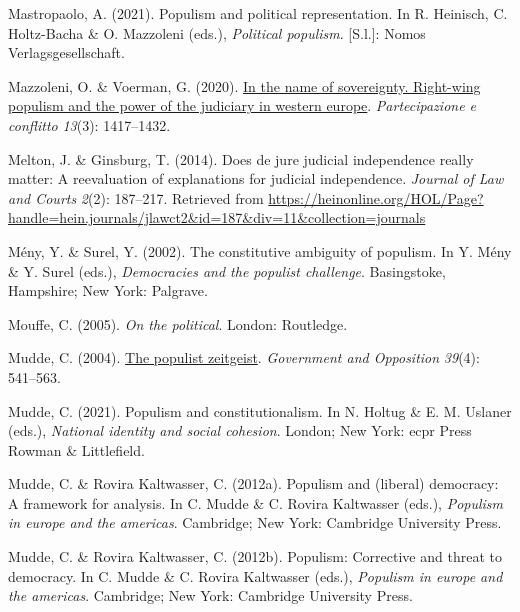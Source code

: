\documentclass[
  abstract]{article}
\newlength{\cslhangindent}
\newlength{\cslentryspacingunit} %
\newenvironment{CSLReferences}[2] %
 {%
  \setlength{\parindent}{0pt}
  \ifodd #1
  \let\oldpar\par
  \def\par{\hangindent=\cslhangindent\oldpar}
  \fi
  \setlength{\parskip}{#2\cslentryspacingunit}
 }%
 {}
\begin{document}
\begin{CSLReferences}{1}{0}
\leavevmode{}%
Mastropaolo, A. (2021). Populism and political representation. In R.
Heinisch, C. Holtz-Bacha \& O. Mazzoleni (eds.), \emph{Political
populism}. {[}S.l.{]}: {Nomos Verlagsgesellschaft}.

\leavevmode{}%
Mazzoleni, O. \& Voerman, G. (2020).
\href{https://doi.org/10.1285/I20356609V13I3P1417}{In the name of
sovereignty. Right-wing populism and the power of the judiciary in
western europe}. \emph{Partecipazione e conflitto} \emph{13}(3):
1417--1432.

\leavevmode{}%
Melton, J. \& Ginsburg, T. (2014). Does de jure judicial independence
really matter: A reevaluation of explanations for judicial independence.
\emph{Journal of Law and Courts} \emph{2}(2): 187--217. Retrieved from
\url{https://heinonline.org/HOL/Page?handle=hein.journals/jlawct2\&id=187\&div=11\&collection=journals}

\leavevmode{}%
Mény, Y. \& Surel, Y. (2002). The constitutive ambiguity of populism. In
Y. Mény \& Y. Surel (eds.), \emph{Democracies and the populist
challenge}. Basingstoke, Hampshire; New York: Palgrave.

\leavevmode{}%
Mouffe, C. (2005). \emph{On the political}. London: Routledge.

\leavevmode{}%
Mudde, C. (2004).
\href{https://doi.org/10.1111/j.1477-7053.2004.00135.x}{The populist
zeitgeist}. \emph{Government and Opposition} \emph{39}(4): 541--563.

\leavevmode{}%
Mudde, C. (2021). Populism and constitutionalism. In N. Holtug \& E. M.
Uslaner (eds.), \emph{National identity and social cohesion}. London;
New York: {ecpr Press Rowman {\&} Littlefield}.

\leavevmode{}%
Mudde, C. \& Rovira Kaltwasser, C. (2012a). Populism and (liberal)
democracy: A framework for analysis. In C. Mudde \& C. Rovira Kaltwasser
(eds.), \emph{Populism in europe and the americas}. Cambridge; New York:
{Cambridge University Press}.

\leavevmode{}%
Mudde, C. \& Rovira Kaltwasser, C. (2012b). Populism: Corrective and
threat to democracy. In C. Mudde \& C. Rovira Kaltwasser (eds.),
\emph{Populism in europe and the americas}. Cambridge; New York:
{Cambridge University Press}.


\end{CSLReferences}
\end{document}
